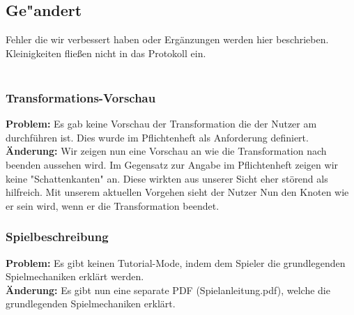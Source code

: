 %



\subsection{Ge{"a}ndert}
\label{Abschnitt:Aenderungen:Protokoll:Behobene_Probleme}

Fehler die wir verbessert haben oder Ergänzungen werden hier beschrieben. Kleinigkeiten fließen nicht in das Protokoll ein.\\~\\











\subsubsection*{Transformations-Vorschau}

\textbf{Problem:}
Es gab keine Vorschau der Transformation die der Nutzer am durchführen ist. Dies wurde im Pflichtenheft als Anforderung definiert.\\

\textbf{Änderung:}
Wir zeigen nun eine Vorschau an wie die Transformation nach beenden aussehen wird. Im Gegensatz zur Angabe im Pflichtenheft zeigen wir keine "Schattenkanten" an. Diese wirkten aus unserer Sicht eher störend als hilfreich. Mit unserem aktuellen Vorgehen sieht der Nutzer Nun den Knoten wie er sein wird, wenn er die Transformation beendet.







\subsubsection*{Spielbeschreibung}

\textbf{Problem:}
Es gibt keinen Tutorial-Mode, indem dem Spieler die grundlegenden Spielmechaniken erklärt werden.\\

\textbf{Änderung:} Es gibt nun eine separate PDF (\glqq Spielanleitung.pdf\grqq), welche die grundlegenden Spielmechaniken erklärt.\\



